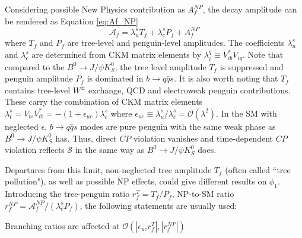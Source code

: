 \begin{comment}
First,  the $b\to q\bar{q}s$  gives a different vertex in gluonic decay than tree diagram. 
Second, such process is tree level suppressed but penguin-dominated, so the New Physics effects can be easier to be spotted. The SM agrees with tree level process in percent accuracy so the sub-percent BSM effects may be hard to see. Similar to Fig(1-7), due to FCNC tree level forbidden, 
\begin{figure}[H]
\centering
\texttt{[image: Bto3Ks]}
\caption{penguin mode $b\to q\bar{q}s$ where $\phi$ is formed by two strange quark as the intermediate state.}
\end{figure}

\end{comment}
Considering possible New Physics contribution as $A_f^{NP}$, the decay amplitude can be rendered as Equation \ref{eq:Af_NP} 
\begin{equation}\label{eq:Af_NP}
\mathcal{A}_f= 
\lambda^s_u T_f + 
\lambda^s_c P_f +
{A}_f^{NP} 
\end{equation}
where $T_f$ and $P_f$ are tree-level and penguin-level amplitudes. The coefficients $\lambda^s_u$ and $\lambda^s_c$  are determined from CKM matrix elements by $\lambda^q_i \equiv V^*_{ib}V_{iq}$. Note that compared to the $B^0 \to J/\psi K^0_S$,
the tree level amplitude $T_f$ is suppressed and penguin amplitude $P_f$ is dominated in $b\to q\bar{q}s$. It is also worth noting that $T_f$ contains tree-level $W^{\pm}$ exchange, QCD and electroweak penguin contributions. These carry the combination of CKM matrix elements $\lambda_t^s = V_{ts}V^*_{tb}=-(1+\epsilon_{uc})\lambda^s_c$ where $\epsilon_{uc} \equiv \lambda^s_u / \lambda^s_c = \mathcal{O}(\lambda^2)$. In the SM with neglected $\epsilon$,  $b\to q\bar{q}s$ modes are pure penguin with the same weak phase as $B^0 \to J/\psi K^0_S$ has. Thus, direct $CP$ violation vanishes and time-dependent $CP$ violation reflects $\mathcal{S}$ in the same way as $B^0 \to J/\psi K^0_S$ does. 

Departures from this limit, non-neglected tree amplitude $T_f$ (often called ``tree pollution"), as well as possible NP effects, could give different results on $\phi_1$. Introducing the tree-penguin ratio $r^T_f = T_f / P_f$, NP-to-SM ratio $r^{NP}_f = \mathcal{A}^{NP}_f / (\lambda^s_c P_f)$, the following statements are usually used\cite{b2book}:

\textbullet \space Branching ratios are affected at $\mathcal{O}(|\epsilon_{uc}r^T_f|,|r^{NP}_f|)$

